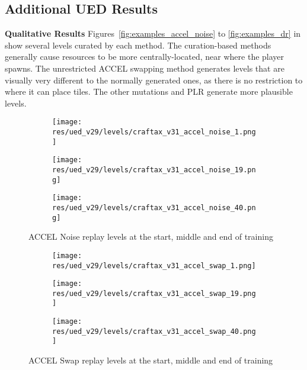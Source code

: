 \documentclass{article}
\theoremstyle{plain}
\theoremstyle{definition}
\theoremstyle{remark}
\begin{document}
\subsection{Additional UED Results}

\textbf{Qualitative Results}
Figures~\ref{fig:examples_accel_noise} to \ref{fig:examples_dr} in show several levels curated by each method. 
The curation-based methods generally cause resources to be more centrally-located, near where the player spawns. The unrestricted ACCEL swapping method generates levels that are visually very different to the normally generated ones, as there is no restriction to where it can place tiles. The other mutations and PLR generate more plausible levels.


\begin{figure}[H]
    \begin{minipage}{0.47\linewidth}
        \centering
        \begin{subfigure}[t]{0.3\linewidth}
            \texttt{[image: res/ued\_v29/levels/craftax\_v31\_accel\_noise\_1.png]}
        \end{subfigure}\hfill%
        \begin{subfigure}[t]{0.3\linewidth}
            \texttt{[image: res/ued\_v29/levels/craftax\_v31\_accel\_noise\_19.png]}
        \end{subfigure}\hfill%
        \begin{subfigure}[t]{0.3\linewidth}
            \texttt{[image: res/ued\_v29/levels/craftax\_v31\_accel\_noise\_40.png]}
        \end{subfigure}%
        \caption{ACCEL Noise replay levels at the start, middle and end of training}
        \label{fig:examples_accel_noise}
    \end{minipage}\hfill
    \begin{minipage}{0.47\linewidth}
        \centering
        \begin{subfigure}[t]{0.3\linewidth}
            \texttt{[image: res/ued\_v29/levels/craftax\_v31\_accel\_swap\_1.png]}
        \end{subfigure}\hfill%
        \begin{subfigure}[t]{0.3\linewidth}
            \texttt{[image: res/ued\_v29/levels/craftax\_v31\_accel\_swap\_19.png]}
        \end{subfigure}\hfill%
        \begin{subfigure}[t]{0.3\linewidth}
            \texttt{[image: res/ued\_v29/levels/craftax\_v31\_accel\_swap\_40.png]}
        \end{subfigure}%
        \caption{ACCEL Swap replay levels at the start, middle and end of training}
        \label{fig:examples_accel_swap}
    \end{minipage}
\end{figure}
\end{document}
